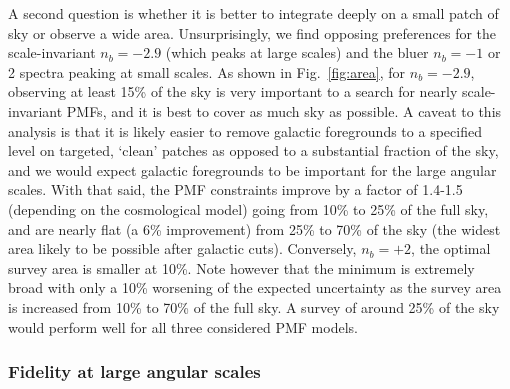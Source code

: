 \documentclass[apj]{emulateapj}
\begin{document}
A second question is whether it is better to integrate deeply on a small patch of sky or observe a wide area. 
Unsurprisingly, we find opposing preferences for the scale-invariant $n_b=-2.9$ (which peaks at large scales) and the bluer $n_b=-1$ or 2 spectra peaking at small scales. 
As shown in  Fig.~\ref{fig:area}, for $n_b=-2.9$, observing at least 15\% of the sky is very important to a search for nearly scale-invariant PMFs, and it is best  to cover as much sky as possible. 
A caveat to this analysis is that it is likely easier to remove galactic foregrounds to a specified level on targeted, `clean' patches as opposed to a substantial fraction of the sky, and we would expect galactic foregrounds to be important for the large angular scales. 
With that said, the PMF constraints improve by a factor of 1.4-1.5 (depending on the cosmological model) going from 10\% to 25\% of the full sky, and are nearly flat (a 6\% improvement) from 25\% to 70\% of the sky (the widest area likely to be possible after galactic cuts).
Conversely, $n_b=+2$, the optimal survey area is smaller at 10\%. 
Note however that the minimum is extremely broad with only a 10\% worsening of the expected uncertainty as the survey area is increased from 10\% to 70\% of the  full sky. 
A survey of around 25\% of the sky would perform well for all three considered PMF models. 

\subsubsection{Fidelity at large angular scales}
\end{document}

